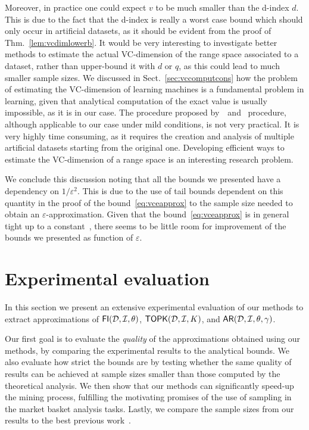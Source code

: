 Moreover, in practice one could expect $v$ to be much smaller than the d-index
$d$. This is due to the fact that the d-index is really a worst case bound which
should only occur in artificial datasets, as it should be evident from the
proof of Thm.~\ref{lem:vcdimlowerb}. It would be very interesting to investigate
better methods to estimate the actual VC-dimension of the range space associated
to a dataset, rather than upper-bound it with $d$ or $q$, as this could lead to
much smaller sample sizes. We discussed in Sect.~\ref{sec:vccomputcons} how the
problem of estimating the VC-dimension of learning machines is a fundamental problem in learning, given that analytical
computation of the exact value is usually impossible, as it is in our
case. The
procedure proposed by~\citet{VapnikLLC94}~and~\citet{ShaoCL00} procedure,
although applicable to our case under mild conditions, is not very practical. It
is very highly time consuming, as it requires the creation and analysis of
multiple artificial datasets starting from the original one.  Developing
efficient ways to estimate the VC-dimension of a range space is an interesting
research problem. 

We conclude this discussion noting that all the bounds we presented have a
dependency on $1/\varepsilon^2$. This is due to the use of tail bounds dependent
on this quantity in the proof of the bound~\eqref{eq:vceapprox} to the sample size
needed to obtain an $\varepsilon$-approximation. Given that the
bound~\eqref{eq:vceapprox} is in general tight up to a constant~\citep{LiLS01},
there seems to be little room for improvement of the bounds we presented as
function of $\varepsilon$.

\section{Experimental evaluation}\label{sec:vcmineexp}
In this section we present an extensive experimental evaluation of
our methods to extract approximations of $\mathsf{FI}({\cal D},{\cal I},\theta)$, $\mathsf{TOPK}({\cal D},{\cal I},K)$, and
$\mathsf{AR}({\cal D},{\cal I},\theta,\gamma)$.

Our first goal is to evaluate the \emph{quality} of the
approximations obtained using our methods, by comparing the experimental results 
to the analytical bounds. We also evaluate how strict the bounds are
 by testing whether the same quality of results can be
achieved at sample sizes smaller than those computed by the theoretical analysis. 
We then show that our methods can significantly speed-up the mining process,
fulfilling the motivating promises of the use of sampling in the market basket
analysis tasks. Lastly, we compare the sample sizes from our results to the best
previous work~\citep{ChakaravarthyPS09}.

